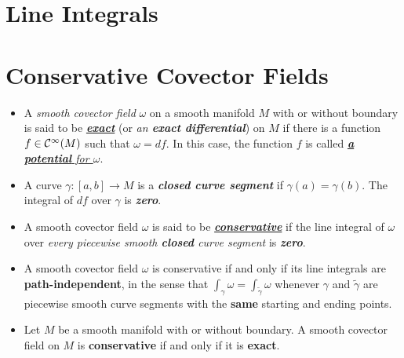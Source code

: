 \documentclass[11pt]{article}
\begin{document}
\section{Line Integrals}

\section{Conservative Covector Fields}
\begin{itemize}
\item \begin{definition}
A \emph{smooth covector field} $\omega$ on a smooth manifold $M$ with or without boundary is said to be \underline{\emph{\textbf{exact}}} (or \emph{an \textbf{exact differential}}) on $M$ if there is a function $f \in {\mathcal C}^{\infty}(M)$ such that $\omega = df$. In this case, the function $f$ is called \underline{\emph{\textbf{a potential} for $\omega$}}.
\end{definition}

\item \begin{definition}
A curve $\gamma: [a,b]\rightarrow M$ is a \emph{\textbf{closed curve segment}} if $\gamma(a) = \gamma(b)$. The integral of $df$ over $\gamma$ is \emph{\textbf{zero}}.
\end{definition}

\item \begin{definition}
A smooth covector field $\omega$ is said to be \underline{\emph{\textbf{conservative}}} if the line integral of $\omega$ over \emph{every piecewise smooth \textbf{closed} curve segment} is \emph{\textbf{zero}}. 
\end{definition}

\item \begin{proposition}
A smooth covector field $\omega$ is conservative if and only if its line integrals are \textbf{path-independent}, in the sense that $\int_{\gamma}\omega = \int_{\widetilde{\gamma}}\omega$ whenever $\gamma$ and $\widetilde{\gamma}$ are piecewise smooth curve segments with the \textbf{same} starting and ending points.
\end{proposition}

\item \begin{theorem}
Let $M$ be a smooth manifold with or without boundary. A smooth covector field on $M$ is \textbf{conservative} if and only if it is \textbf{exact}.
\end{theorem}


\end{itemize}
\end{document}
